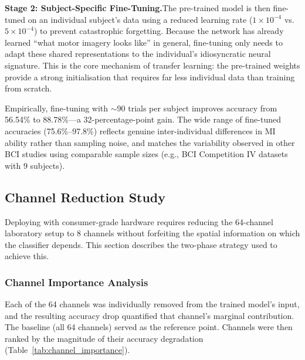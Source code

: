 \documentclass[12pt, a4paper]{article}
\begin{document}
\textbf{Stage 2: Subject-Specific Fine-Tuning.}\quad The pre-trained model is then fine-tuned on an individual subject's data using a reduced learning rate ($1 \times 10^{-4}$ vs.\ $5 \times 10^{-4}$) to prevent catastrophic forgetting. Because the network has already learned ``what motor imagery looks like'' in general, fine-tuning only needs to adapt these shared representations to the individual's idiosyncratic neural signature. This is the core mechanism of transfer learning: the pre-trained weights provide a strong initialisation that requires far less individual data than training from scratch.

Empirically, fine-tuning with $\sim$90 trials per subject improves accuracy from 56.54\% to 88.78\%---a 32-percentage-point gain. The wide range of fine-tuned accuracies (75.6\%--97.8\%) reflects genuine inter-individual differences in MI ability rather than sampling noise, and matches the variability observed in other BCI studies using comparable sample sizes (e.g., BCI Competition IV datasets with 9 subjects).

\subsection{Channel Reduction Study}

Deploying with consumer-grade hardware requires reducing the 64-channel laboratory setup to 8 channels without forfeiting the spatial information on which the classifier depends. This section describes the two-phase strategy used to achieve this.

\subsubsection{Channel Importance Analysis}

Each of the 64 channels was individually removed from the trained model's input, and the resulting accuracy drop quantified that channel's marginal contribution. The baseline (all 64 channels) served as the reference point. Channels were then ranked by the magnitude of their accuracy degradation (Table~\ref{tab:channel_importance}).
\end{document}
